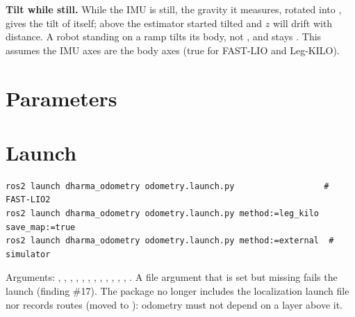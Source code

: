 \textbf{Tilt while still.} While the IMU is still, the gravity it measures, rotated into
, gives the tilt of  itself; above  the estimator
started tilted and $z$ will drift with distance. A robot standing on a ramp tilts its body, not
, and stays . This assumes the IMU axes are the  body axes
(true for FAST-LIO and Leg-KILO).

\section{Parameters}

\readonlynote



\section{Launch}

\begin{lstlisting}
ros2 launch dharma_odometry odometry.launch.py                  # FAST-LIO2
ros2 launch dharma_odometry odometry.launch.py method:=leg_kilo save_map:=true
ros2 launch dharma_odometry odometry.launch.py method:=external  # simulator
\end{lstlisting}

Arguments: , , , ,
, , , , ,
, , ,
. A file argument that is set but missing fails the launch (finding
\#17). The package no longer includes the localization launch file nor records routes (moved
to ): odometry must not depend on a layer above it.
